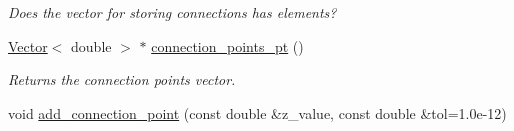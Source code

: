\begin{DoxyCompactItemize}
\begin{DoxyCompactList}\small\item\em Does the vector for storing connections has elements? \end{DoxyCompactList}\item 
\hyperlink{classoomph_1_1Vector}{Vector}$<$ double $>$ $\ast$ \hyperlink{classoomph_1_1TriangleMeshCurviLine_aae5de91e63c33bf883a12bde571e1364}{connection\+\_\+points\+\_\+pt} ()
\begin{DoxyCompactList}\small\item\em Returns the connection points vector. \end{DoxyCompactList}\item 
void \hyperlink{classoomph_1_1TriangleMeshCurviLine_a3605aa21fbdec5f73b1baf842fdb4611}{add\+\_\+connection\+\_\+point} (const double \&z\+\_\+value, const double \&tol=1.\+0e-\/12)
\end{DoxyCompactItemize}
